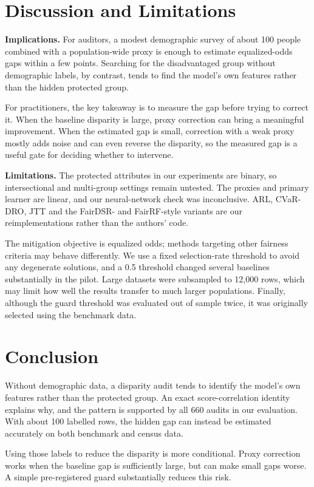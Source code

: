 \documentclass[conference]{IEEEtran}
\begin{document}
\section{Discussion and Limitations}
\textbf{Implications.} For auditors, a modest demographic survey of about 100 people combined with a population-wide proxy is enough to estimate equalized-odds gaps within a few points. Searching for the disadvantaged group without demographic labels, by contrast, tends to find the model's own features rather than the hidden protected group.

For practitioners, the key takeaway is to measure the gap before trying to correct it. When the baseline disparity is large, proxy correction can bring a meaningful improvement. When the estimated gap is small, correction with a weak proxy mostly adds noise and can even reverse the disparity, so the measured gap is a useful gate for deciding whether to intervene.

\textbf{Limitations.} The protected attributes in our experiments are binary, so intersectional and multi-group settings remain untested. The proxies and primary learner are linear, and our neural-network check was inconclusive. ARL, CVaR-DRO, JTT and the FairDSR- and FairRF-style variants are our reimplementations rather than the authors' code.

The mitigation objective is equalized odds; methods targeting other fairness criteria may behave differently. We use a fixed selection-rate threshold to avoid any degenerate solutions, and a 0.5 threshold changed several baselines substantially in the pilot. Large datasets were subsampled to 12{,}000 rows, which may limit how well the results transfer to much larger populations. Finally, although the guard threshold was evaluated out of sample twice, it was originally selected using the benchmark data.

\section{Conclusion}
Without demographic data, a disparity audit tends to identify the model's own features rather than the protected group. An exact score-correlation identity explains why, and the pattern is supported by all 660 audits in our evaluation. With about 100 labelled rows, the hidden gap can instead be estimated accurately on both benchmark and census data.

Using those labels to reduce the disparity is more conditional. Proxy correction works when the baseline gap is sufficiently large, but can make small gaps worse. A simple pre-registered guard substantially reduces this risk.
\end{document}
